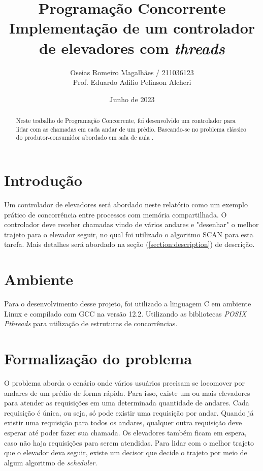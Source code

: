 \documentclass[a4paper,final,12pt]{article}
\title{Programação Concorrente \\ Implementação de um controlador de elevadores com \textit{threads}}
\author{Oseias Romeiro Magalhães / 211036123 \\ Prof. Eduardo Adilio Pelinson Alcheri}
\date{Junho de 2023}
\begin{document}
\maketitle

\begin{abstract}
Neste trabalho de Programação Concorrente, foi desenvolvido um controlador para lidar com as chamadas em cada andar de um prédio. Baseando-se no problema clássico do produtor-consumidor abordado em sala de aula \cite{pc}.
\end{abstract}

\section{Introdução}\label{section:introduction}
Um controlador de elevadores será abordado neste relatório como um exemplo prático de concorrência entre processos com memória compartilhada. O controlador deve receber chamadas vindo de vários andares e "desenhar" o melhor trajeto para o elevador seguir, no qual foi utilizado o algoritmo SCAN para esta tarefa. Mais detalhes será abordado na seção (\ref{section:description}) de descrição.

\section{Ambiente}\label{section:environment}

Para o desenvolvimento desse projeto, foi utilizado a linguagem C em ambiente Linux e compilado com GCC na versão 12.2. Utilizando as bibliotecas \textit{POSIX Pthreads} para utilização de estruturas de concorrências.

\section{Formalização do problema}\label{section:formalization}
O problema aborda o cenário onde vários usuários precisam se locomover por andares de um prédio de forma rápida. Para isso, existe um ou mais elevadores para atender as requisições em uma determinada quantidade de andares. Cada requisição é única, ou seja, só pode existir uma requisição por andar. Quando já existir uma requisição para todos os andares, qualquer outra requisição deve esperar até poder fazer sua chamada. Os elevadores também ficam em espera, caso não haja requisições para serem atendidas. Para lidar com o melhor trajeto que o elevador deva seguir, existe um decisor que decide o trajeto por meio de algum algoritmo de \textit{scheduler}.
\end{document}
